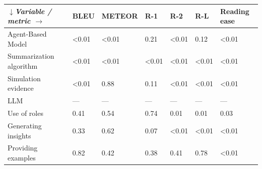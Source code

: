\begin{tabular}{|l|l|l|l|l|l|l|}
\hline
\textit{$\downarrow$Variable / metric $\rightarrow$} & BLEU & METEOR & R-1 & R-2 & R-L & Reading ease \\
 \hline
 Agent-Based Model & \textless{}0.01 & \textless{}0.01 & 0.21 & \textless{}0.01 & 0.12 & \textless{}0.01 \\
 \hline
 Summarization algorithm & \textless{}0.01 & \textless{}0.01 & \textless{}0.01 & \textless{}0.01 & \textless{}0.01 & \textless{}0.01 \\
 \hline
 Simulation evidence & \textless{}0.01 & 0.88 & 0.11 & \textless{}0.01 & \textless{}0.01 & \textless{}0.01 \\
 \hline
 LLM & — & — & — & — & — & — \\
 \hline
 Use of roles & 0.41 & 0.54 & 0.74 & 0.01 & 0.01 & 0.03 \\
 \hline
 Generating insights & 0.33 & 0.62 & 0.07 & \textless{}0.01 & \textless{}0.01 & \textless{}0.01 \\
 \hline
 Providing examples & 0.82 & 0.42 & 0.38 & 0.41 & 0.78 & \textless{}0.01 \\
\hline
\end{tabular}
